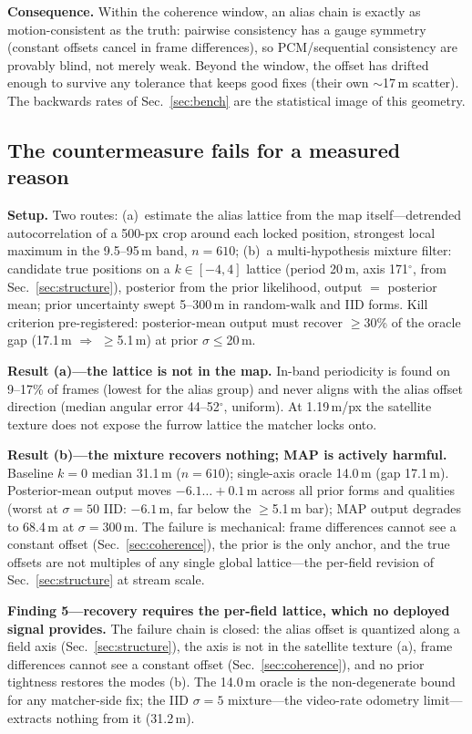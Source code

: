 \documentclass[journal]{IEEEtran}
\begin{document}
\textbf{Consequence.} Within the coherence window, an alias chain is exactly as motion-consistent as the truth: pairwise consistency has a gauge symmetry (constant offsets cancel in frame differences), so PCM/sequential consistency are provably blind, not merely weak. Beyond the window, the offset has drifted enough to survive any tolerance that keeps good fixes (their own $\sim$17\,m scatter). The backwards rates of Sec.~\ref{sec:bench} are the statistical image of this geometry.

\subsection{The countermeasure fails for a measured reason}
\label{sec:counter}

\textbf{Setup.} Two routes: (a)~estimate the alias lattice from the map itself---detrended autocorrelation of a 500-px crop around each locked position, strongest local maximum in the 9.5--95\,m band, $n=610$; (b)~a multi-hypothesis mixture filter: candidate true positions on a $k\in[-4,4]$ lattice (period 20\,m, axis 171$^{\circ}$, from Sec.~\ref{sec:structure}), posterior from the prior likelihood, output $=$ posterior mean; prior uncertainty swept 5--300\,m in random-walk and IID forms. Kill criterion pre-registered: posterior-mean output must recover $\geq$30\% of the oracle gap (17.1\,m $\Rightarrow$ $\geq$5.1\,m) at prior $\sigma\leq$20\,m.

\textbf{Result (a)---the lattice is not in the map.} In-band periodicity is found on 9--17\% of frames (lowest for the alias group) and never aligns with the alias offset direction (median angular error 44--52$^{\circ}$, uniform). At 1.19\,m/px the satellite texture does not expose the furrow lattice the matcher locks onto.

\textbf{Result (b)---the mixture recovers nothing; MAP is actively harmful.} Baseline $k=0$ median 31.1\,m ($n=610$); single-axis oracle 14.0\,m (gap 17.1\,m). Posterior-mean output moves $-6.1\ldots+0.1$\,m across all prior forms and qualities (worst at $\sigma=50$ IID: $-6.1$\,m, far below the $\geq$5.1\,m bar); MAP output degrades to 68.4\,m at $\sigma=300$\,m. The failure is mechanical: frame differences cannot see a constant offset (Sec.~\ref{sec:coherence}), the prior is the only anchor, and the true offsets are not multiples of any single global lattice---the per-field revision of Sec.~\ref{sec:structure} at stream scale.

\textbf{Finding 5---recovery requires the per-field lattice, which no deployed signal provides.} The failure chain is closed: the alias offset is quantized along a field axis (Sec.~\ref{sec:structure}), the axis is not in the satellite texture (a), frame differences cannot see a constant offset (Sec.~\ref{sec:coherence}), and no prior tightness restores the modes (b). The 14.0\,m oracle is the non-degenerate bound for any matcher-side fix; the IID $\sigma=5$ mixture---the video-rate odometry limit---extracts nothing from it (31.2\,m).
\end{document}
